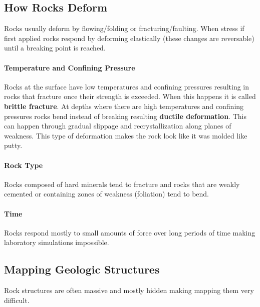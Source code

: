 \documentclass{article}
\begin{document}
\subsection{How Rocks Deform} %
\label{sub:how_rocks_deform}
Rocks usually deform by flowing/folding or fracturing/faulting. When stress if first applied rocks respond by deforming elastically (these changes are reversable) until a breaking point is reached.

\paragraph{Temperature and Confining Pressure} %
\label{par:temperature_and_confining_pressure}
Rocks at the surface have low temperatures and confining pressures resulting in rocks that fracture once their strength is exceeded. When this happens it is called \textbf{brittle fracture}. At depths where there are high temperatures and confining pressures rocks bend instead of breaking resulting \textbf{ductile deformation}. This can happen through gradual slippage and recrystallization along planes of weakness. This type of deformation makes the rock look like it was molded like putty.

\paragraph{Rock Type} %
\label{par:rock_type}
Rocks composed of hard minerals tend to fracture and rocks that are weakly cemented or containing zones of weakness (foliation) tend to bend.

\paragraph{Time} %
\label{par:time}
Rocks respond mostly to small amounts of force over long periods of time making laboratory simulations impossible.


\subsection{Mapping Geologic Structures} %
\label{sub:mapping_geologic_structures}
Rock structures are often massive and mostly hidden making mapping them very difficult.
\end{document}
